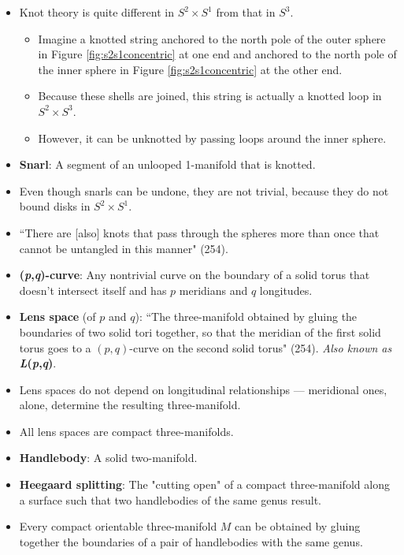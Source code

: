 \documentclass[titlepage]{article}
\numberwithin{figure}{section}
\numberwithin{table}{section}
\numberwithin{equation}{section}
\newcommand{\dq}[2]{``#1" (#2).}
\begin{document}
\begin{itemize}
\begin{itemize}
    \end{itemize}
    \item Knot theory is quite different in $S^2\times S^1$ from that in $S^3$.
    \begin{itemize}
        \item Imagine a knotted string anchored to the north pole of the outer sphere in Figure \ref{fig:s2s1concentric} at one end and anchored to the north pole of the inner sphere in Figure \ref{fig:s2s1concentric} at the other end.
        \item Because these shells are joined, this string is actually a knotted loop in $S^2\times S^3$.
        \item However, it can be unknotted by passing loops around the inner sphere.
    \end{itemize}
    \item \textbf{Snarl}: A segment of an unlooped 1-manifold that is knotted.
    \item Even though snarls can be undone, they are not trivial, because they do not bound disks in $S^2\times S^1$.
    \item \dq{There are [also] knots that pass through the spheres more than once that cannot be untangled in this manner}{254}
    \item \textbf{(\emph{p},\emph{q})-curve}: Any nontrivial curve on the boundary of a solid torus that doesn't intersect itself and has $p$ meridians and $q$ longitudes.
    \item \textbf{Lens space} (of $p$ and $q$): \dq{The three-manifold obtained by gluing the boundaries of two solid tori together, so that the meridian of the first solid torus goes to a $(p,q)$-curve on the second solid torus}{254} \emph{Also known as} \textbf{\emph{L}(\emph{p},\emph{q})}.
    \item Lens spaces do not depend on longitudinal relationships --- meridional ones, alone, determine the resulting three-manifold.
    \item All lens spaces are compact three-manifolds.
    \item \textbf{Handlebody}: A solid two-manifold.
    \item \textbf{Heegaard splitting}: The "cutting open" of a compact three-manifold along a surface such that two handlebodies of the same genus result.
    \item Every compact orientable three-manifold $M$ can be obtained by gluing together the boundaries of a pair of handlebodies with the same genus.
    \begin{itemize}

\end{itemize}
\end{itemize}
\end{document}
